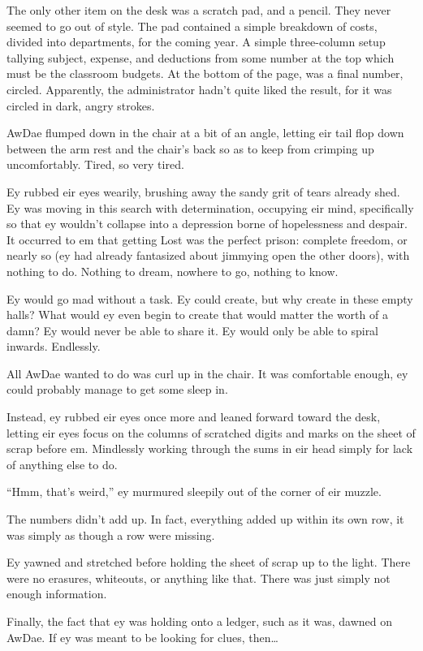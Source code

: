 The only other item on the desk was a scratch pad, and a pencil. They never seemed to go out of style. The pad contained a simple breakdown of costs, divided into departments, for the coming year. A simple three-column setup tallying subject, expense, and deductions from some number at the top which must be the classroom budgets. At the bottom of the page, was a final number, circled. Apparently, the administrator hadn't quite liked the result, for it was circled in dark, angry strokes.

AwDae flumped down in the chair at a bit of an angle, letting eir tail flop down between the arm rest and the chair's back so as to keep from crimping up uncomfortably. Tired, so very tired.

Ey rubbed eir eyes wearily, brushing away the sandy grit of tears already shed. Ey was moving in this search with determination, occupying eir mind, specifically so that ey wouldn't collapse into a depression borne of hopelessness and despair. It occurred to em that getting Lost was the perfect prison: complete freedom, or nearly so (ey had already fantasized about jimmying open the other doors), with nothing to do. Nothing to dream, nowhere to go, nothing to know.

Ey would go mad without a task. Ey could create, but why create in these empty halls? What would ey even begin to create that would matter the worth of a damn? Ey would never be able to share it. Ey would only be able to spiral inwards. Endlessly.

All AwDae wanted to do was curl up in the chair. It was comfortable enough, ey could probably manage to get some sleep in.

Instead, ey rubbed eir eyes once more and leaned forward toward the desk, letting eir eyes focus on the columns of scratched digits and marks on the sheet of scrap before em. Mindlessly working through the sums in eir head simply for lack of anything else to do.

``Hmm, that's weird,'' ey murmured sleepily out of the corner of eir muzzle.

The numbers didn't add up. In fact, everything added up within its own row, it was simply as though a row were missing.

Ey yawned and stretched before holding the sheet of scrap up to the light. There were no erasures, whiteouts, or anything like that. There was just simply not enough information.

Finally, the fact that ey was holding onto a ledger, such as it was, dawned on AwDae. If ey was meant to be looking for clues, then\ldots{}

